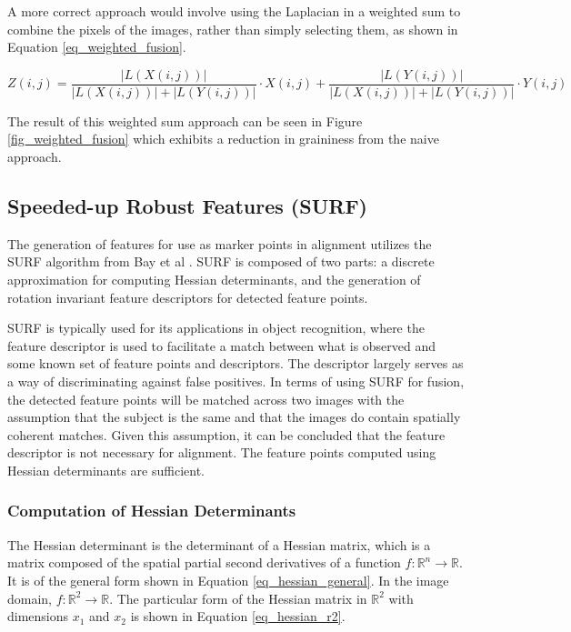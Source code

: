 \documentclass{article}
\begin{document}
A more correct approach would involve using the Laplacian in a weighted sum to combine the pixels of the images, rather than simply selecting them, as shown in Equation \ref{eq_weighted_fusion}.

\begin{equation}
Z(i,j) = \frac{|L(X(i,j))|}{|L(X(i,j))| + |L(Y(i,j))|} \cdot X(i,j) + \frac{|L(Y(i,j))|}{|L(X(i,j))| + |L(Y(i,j))|} \cdot Y(i,j)
\label{eq_weighted_fusion}
\end{equation}

The result of this weighted sum approach can be seen in Figure \ref{fig_weighted_fusion} which exhibits a reduction in graininess from the naive approach.

\subsection{Speeded-up Robust Features (SURF)}

The generation of features for use as marker points in alignment utilizes the SURF algorithm from Bay et al \cite{bay_surf:_2006}. SURF is composed of two parts: a discrete approximation for computing Hessian determinants, and the generation of rotation invariant feature descriptors for detected feature points. 

SURF is typically used for its applications in object recognition, where the feature descriptor is used to facilitate a match between what is observed and some known set of feature points and descriptors. The descriptor largely serves as a way of discriminating against false positives. In terms of using SURF for fusion, the detected feature points will be matched across two images with the assumption that the subject is the same and that the images do contain spatially coherent matches. Given this assumption, it can be concluded that the feature descriptor is not necessary for alignment. The feature points computed using Hessian determinants are sufficient.

\subsubsection{Computation of Hessian Determinants}

The Hessian determinant is the determinant of a Hessian matrix, which is a matrix composed of the spatial partial second derivatives of a function $f : \mathbb{R}^n \rightarrow \mathbb{R}$. It is of the general form shown in Equation \ref{eq_hessian_general}. In the image domain, $f : \mathbb{R}^2 \rightarrow \mathbb{R}$. The particular form of the Hessian matrix in $\mathbb{R}^2$ with dimensions $x_1$ and $x_2$ is shown in Equation \ref{eq_hessian_r2}.
\end{document}
